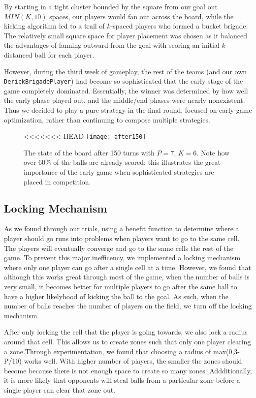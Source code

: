 \documentclass[
10pt, %
letterpaper, %
oneside, %
headinclude,footinclude, %
english
]{article}
\begin{document}
By starting in a tight cluster bounded by the square from our goal out $MIN(K,10)$ spaces, our players would fan out across the board, while the kicking algorithm led to a trail of $k$-spaced players who formed a bucket brigade. The relatively small square space for player placement was chosen as it balanced the advantages of fanning outward from the goal with scoring an initial $k$-distanced ball for each player.


However, during the third week of gameplay, the rest of the teams (and our own \texttt{DerickBrigadePlayer}) had become so sophisticated that the early stage of the game completely dominated. Essentially, the winner was determined by how well the early phase played out, and the middle/end phases were nearly nonexistent. Thus we decided to play a pure strategy in the final round, focused on early-game optimization, rather than continuing to compose multiple strategies.

\begin{figure}[h]
\centering 
<<<<<<< HEAD
\texttt{[image: after150]} 
\caption[State of a parallel football board after 150 turns]{The state of the board after 150 turns with $P=7$, $K=6$. Note how over 60\% of the balls are already scored; this illustrates the great importance of the early game when sophisticated strategies are placed in competition.}
\label{fig:gallery2} 
\end{figure}

\subsection{Locking Mechanism}
As we found through our trials, using a benefit function to determine where a player should go runs into problems when players want to go to the same cell. The players will eventually converge and go to the same cells the rest of the game. To prevent this major inefficency, we implemented a locking mechanism where only one player can go after a single cell at a time. However, we found that although this works great through most of the game, when the number of balls is very small, it becomes better for multiple players to go after the same ball to have a higher likelyhood of kicking the ball to the goal. As such, when the number of balls reaches the number of players on the field, we turn off the locking mechanism.

After only locking the cell that the player is going towards, we also lock a radius around that cell. This allows us to create zones such that only one player clearing a zone.Through experimentation, we found that choosing a radius of max(0,3-P/10) works well. With higher number of players, the smaller the zones should become because there is not enough space to create so many zones. Addditionally, it is more likely that opponents will steal balls from a particular zone before a single player can clear that zone out.
\end{document}
